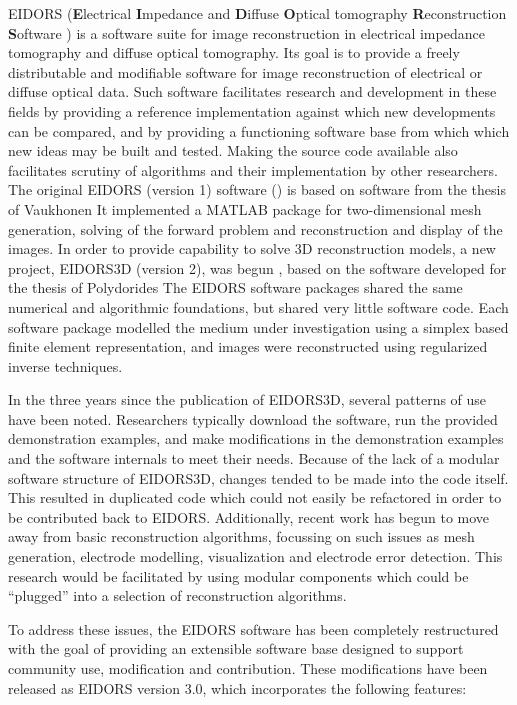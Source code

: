 \documentclass[12pt]{iopart}
\begin{document}
EIDORS
({\bf E}lectrical
 {\bf I}mpedance and
 {\bf D}iffuse
 {\bf O}ptical tomography
 {\bf R}econstruction
 {\bf S}oftware )
is a software suite for image reconstruction in
electrical impedance tomography and diffuse optical tomography.
Its goal is to provide a freely distributable and modifiable
software for image reconstruction of electrical 
or diffuse optical data. Such software facilitates research
and development
in these fields by providing a reference implementation
against which new developments can be compared, and by
providing a functioning software base from which which new
ideas may be built and tested.
Making the source code available also facilitates scrutiny
of algorithms and their implementation by other researchers.
The original EIDORS (version 1) software (\cite{Vauhkonen_etal_2000})
is based on software from the thesis of Vaukhonen \cite{Vauhkonen_1997}
It implemented a MATLAB package for two-dimensional mesh generation,
solving of the forward
problem and reconstruction and display of the images.
In order to provide capability to solve 3D reconstruction models,
a new project, EIDORS3D (version 2), was begun \cite{Polydorides_and_Lionheart_2002},
based on the software developed for the thesis of Polydorides \cite{Polydorides_2002}
The EIDORS software packages shared the same numerical
and algorithmic foundations, but shared very little software code.
Each software package modelled the medium under investigation
using a simplex based finite element representation,
and images were reconstructed using regularized inverse techniques.

In the three years since the publication of EIDORS3D, several patterns
of use have been noted. Researchers typically download the software,
run the provided demonstration examples,  and 
make modifications in the demonstration examples and the software
internals to meet their needs.
Because of the lack of a modular software structure of EIDORS3D,
changes tended to be made into the code itself. This resulted in
duplicated
code which could not easily be refactored in order to
be contributed back to EIDORS. Additionally, recent work has begun to move
away from basic reconstruction algorithms, focussing
on such issues as mesh generation, electrode modelling, visualization
and electrode error detection. This research would be facilitated
by using modular components which could be ``plugged'' into
a selection of reconstruction algorithms.

To address these issues, the EIDORS software has been completely
restructured with the goal of providing an extensible software base
designed to support community use, modification and contribution.
These modifications have been released as EIDORS version 3.0,
which incorporates the following features:
\end{document}
